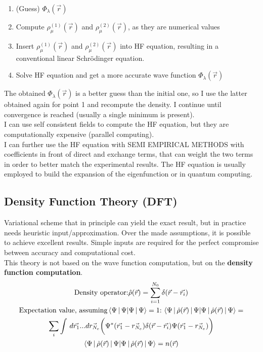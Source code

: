 \begin{enumerate}
	\item (Guess) $\Phi_\lambda (\vec{r})$
	\item Compute $\rho_\mu^{(1)}(\vec{r})$ and $\rho_\mu^{(2)}(\vec{r})$, as they are numerical values
	\item Insert $\rho_\mu^{(1)}(\vec{r})$ and $\rho_\mu^{(2)}(\vec{r})$ into HF equation, resulting in a conventional linear Schr\"odinger equation.
	\item Solve HF equation and get a more accurate wave function $\Phi_\lambda (\vec{r})$
	\end{enumerate}
The obtained $\Phi_\lambda (\vec{r})$ is a better guess than the initial one, so I use the latter obtained again for point 1 and recompute the density. 
I continue until convergence is reached (usually a single minimum is present). \\

I can use self consistent fields to compute the HF equation, but they are computationally expensive (parallel computing). \\

I can further use the HF equation with SEMI EMPIRICAL METHODS with coefficients in front of direct and exchange terms, that can weight the two terms in order to better match the experimental results.  The HF equation is usually employed to build the expansion of the eigenfunction or in quantum computing.\\

\subsection{Density Function Theory (DFT)}
Variational scheme that in principle can yield the exact result,  but in practice needs heuristic input/approximation. 
Over the made assumptions, it is possible to achieve excellent results. 
Simple inputs are required for the perfect compromise between accuracy and computational cost.\\
This theory is not based on the wave function computation, but on the \textbf{density function computation}.\\


\begin{multline}
 \text{Density operator:}\hat{\rho}(\vec{r})=\sum_{i=1}^{N_0}\delta(\vec{r}-\vec{r_i})\\
\text{Expectation value, assuming} \braket{\Psi\,|\,\Psi}=1 \text{:}\, \braket{\Psi\,|\,\hat{\rho}(\vec{r})\,|\,\Psi}=\\
\sum_i \int\,d\vec{r_1}...d\vec{r_{N_e}}\bigg(\Psi^*(\vec{r_1}-\vec{r_{N_e}})\delta(\vec{r}-\vec{r_i})\Psi(\vec{r_1}-\vec{r_{N_e}})\bigg)\\
\braket{\Psi\,|\,\hat{\rho}(\vec{r})\,|\,\Psi}=n(\vec{r})
\end{multline}


